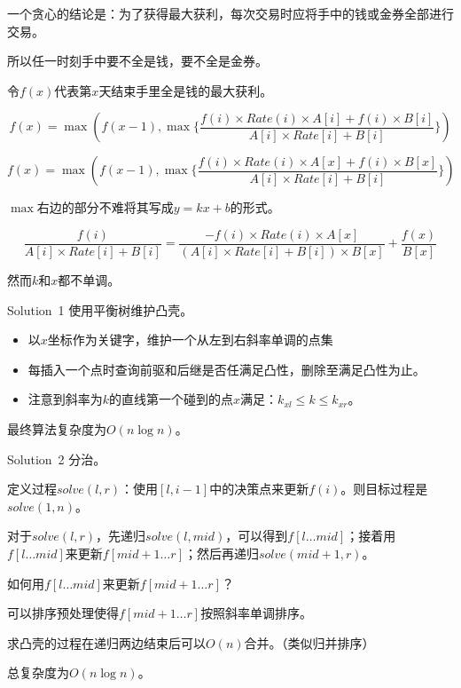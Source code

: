 \documentclass[9pt,dvipsnames,table,UTF8,aspectratio=169]{beamer}
\begin{document}
\begin{frame}
	一个贪心的结论是：为了获得最大获利，每次交易时应将手中的钱或金券全部进行交易。

	所以任一时刻手中要不全是钱，要不全是金券。

	令$f(x)$代表第$x$天结束手里全是钱的最大获利。

	$$f(x) = \max{(f(x - 1), \max{\{\frac{f(i) \times Rate(i) \times A[i] + f(i) \times B[i]}{A[i] \times Rate[i] + B[i]}\}})}$$
\end{frame}

\begin{frame}
	$$f(x) = \max{(f(x - 1), \max{\{\frac{f(i) \times Rate(i) \times A[x] + f(i) \times B[x]}{A[i] \times Rate[i] + B[i]}\}})}$$

	$\max$右边的部分不难将其写成$y = kx + b$的形式。

	$$\frac{f(i)}{A[i] \times Rate[i] + B[i]} = \frac{-f(i) \times Rate(i) \times A[x]}{(A[i] \times Rate[i] + B[i]) \times B[x]} + \frac{f(x)}{B[x]}$$

	然而$k$和$x$都不单调。
\end{frame}

\begin{frame}{Solution\ 1}
	使用平衡树维护凸壳。
	
	\pause
	\begin{itemize}
		\item 以$x$坐标作为关键字，维护一个从左到右斜率单调的点集
		\item 每插入一个点时查询前驱和后继是否任满足凸性，删除至满足凸性为止。
		\item 注意到斜率为$k$的直线第一个碰到的点$x$满足：$k_{xl} \le k \le k_{xr}$。
	\end{itemize}

	最终算法复杂度为$O(n \log{n})$。
\end{frame}

\begin{frame}{Solution\ 2}
	分治。

	\pause
	定义过程$solve(l, r)$：使用$[l, i - 1]$中的决策点来更新$f(i)$。则目标过程是$solve(1, n)$。
	
	对于$solve(l, r)$，先递归$solve(l, mid)$，可以得到$f[l \dots mid]$；接着用$f[l \dots mid]$来更新$f[mid + 1 \dots r]$；然后再递归$solve(mid + 1, r)$。

	\pause
	如何用$f[l \dots mid]$来更新$f[mid + 1 \dots r]$？

	可以排序预处理使得$f[mid + 1 \dots r]$按照斜率单调排序。

	求凸壳的过程在递归两边结束后可以$O(n)$合并。（类似归并排序）

	总复杂度为$O(n\log{n})$。
\end{frame}
\end{document}
